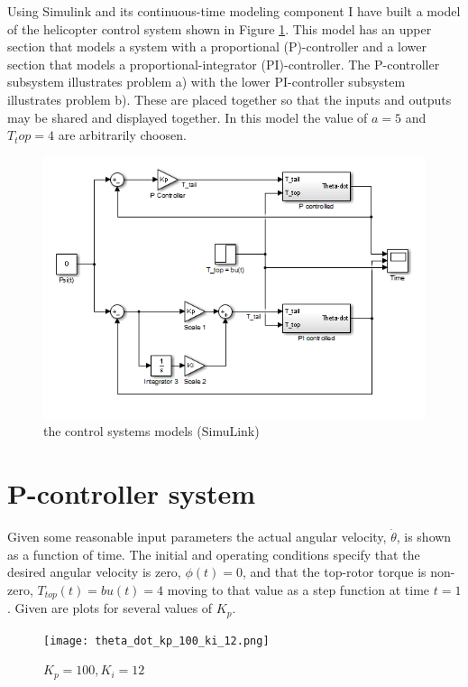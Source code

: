 \documentclass{article}
\begin{document}
Using Simulink and its continuous-time modeling component
I have built a model of the helicopter control
system shown in Figure \ref{fig:control_system}.
This model has an upper section that models a system
with a proportional (P)-controller and a lower section
that models a proportional-integrator (PI)-controller.
The P-controller subsystem illustrates problem a)
with the lower PI-controller subsystem illustrates problem b).
These are placed together so that the inputs and outputs
may be shared and displayed together.
In this model the value of $a = 5$ and $T_top = 4$ are
arbitrarily choosen.


\begin{figure}[h!]
\centering
\includegraphics[scale=0.8]{controller_model.png}
\caption{the control systems models (SimuLink)}
\label{fig:control_system}
\end{figure}

\section{P-controller system}

Given some reasonable input parameters the
actual angular velocity, $\dot{\theta}$, is shown
as a function of time.
The initial and operating conditions
specify that the desired angular velocity
is zero, $\phi (t) = 0$, and that the
top-rotor torque is non-zero,
$T_{top}(t) = b u(t) = 4$ moving to that
value as a step function at time $t = 1$.
Given are plots for several values of $K_p$.

\begin{figure}[h!]
\centering
\texttt{[image: theta\_dot\_kp\_100\_ki\_12.png]}
\caption{$K_p = 100, K_i = 12$}
\label{fig:td_100_12}
\end{figure}
\end{document}
